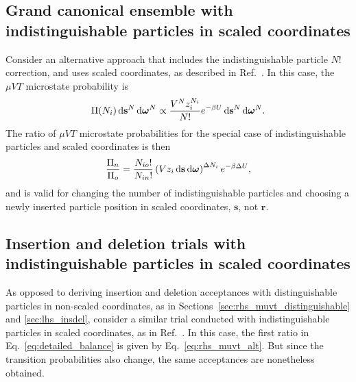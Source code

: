 \begin{figure}

\end{figure}

\subsection{\label{sec:rhs_muvt_alt}Grand canonical ensemble with indistinguishable particles in scaled coordinates}

Consider an alternative approach that includes the indistinguishable particle $N!$ correction, and uses scaled coordinates, as described in Ref.~\cite{frenkel_understanding_2002}.
In this case, the $\mu VT$ microstate probability is
\begin{equation}
\Pi(N_i)\mathop{}\!\mathrm{d}\mathbf{s}^{N}\mathop{}\!\mathrm{d}\boldsymbol{\omega}^{N} \propto \frac{V^{N}z_i^{N_i}}{N!} e^{-\beta U} \mathop{}\!\mathrm{d}\mathbf{s}^{N}\mathop{}\!\mathrm{d}\boldsymbol{\omega}^{N}.
\end{equation}
The ratio of $\mu VT$ microstate probabilities for the special case of indistinguishable particles and scaled coordinates is then
\begin{equation}
\frac{\Pi_n}{\Pi_o} = \frac{N_{io}!}{N_{in}!}\left(V z_i\mathop{}\!\mathrm{d}\mathbf{s}\mathop{}\!\mathrm{d}\boldsymbol{\omega}\right)^{\Delta N_i}e^{-\beta\Delta U},
\label{eq:rhs_muvt_alt}
\end{equation}
and is valid for changing the number of indistinguishable particles and choosing a newly inserted particle position in scaled coordinates, $\mathbf{s}$, not $\mathbf{r}$.


\subsection{\label{sec:lhs_insdel_alt}Insertion and deletion trials with indistinguishable particles in scaled coordinates}

As opposed to deriving insertion and deletion acceptances with distinguishable particles in non-scaled coordinates, as in Sections~\ref{sec:rhs_muvt_distinguishable} and \ref{sec:lhs_insdel}, consider a similar trial conducted with indistinguishable particles in scaled coordinates, as in Ref.~\cite{frenkel_understanding_2002}.
In this case, the first ratio in Eq.~\ref{eq:detailed_balance} is given by Eq.~\ref{eq:rhs_muvt_alt}.
But since the transition probabilities also change, the same acceptances are nonetheless obtained.

